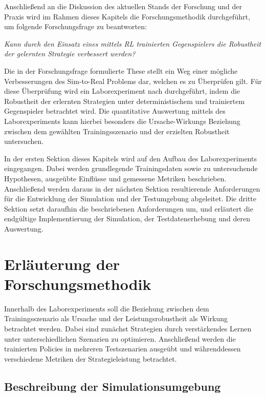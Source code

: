 Anschließend an die Diskussion des aktuellen Stands der Forschung und der Praxis wird im Rahmen dieses Kapitels die Forschungsmethodik durchgeführt, um folgende Forschungsfrage zu beantworten:

\textit{Kann durch den Einsatz eines mittels RL trainierten Gegenspielers die Robustheit der gelernten Strategie verbessert werden?}

Die in der Forschungsfrage formulierte These stellt ein Weg einer mögliche Verbesserungen des Sim-to-Real Problems dar, welchen es zu Überprüfen gilt.
Für diese Überprüfung wird ein Laborexperiment nach \cite[]{Recker.2021} durchgeführt, indem die Robustheit der erlernten Strategien unter deterministischem und trainiertem Gegenspieler betrachtet wird. 
Die quantitative Auswertung mittels des Laborexperiments kann hierbei besonders die Ursache-Wirkungs Beziehung zwischen dem gewählten Trainingsszenario und der erzielten Robustheit untersuchen.

In der ersten Sektion dieses Kapitels wird auf den Aufbau des Laborexperiments eingegangen.
Dabei werden grundlegende Trainingsdaten sowie zu untersuchende Hypothesen, ausgeübte Einflüsse und gemessene Metriken beschrieben.
Anschließend werden daraus in der nächsten Sektion resultierende Anforderungen für die Entwicklung der Simulation und der Testumgebung abgeleitet. 
Die dritte Sektion setzt daraufhin die beschriebenen Anforderungen um, und erläutert die endgültige Implementierung der Simulation, der Testdatenerhebung und deren Auswertung.

\section{Erläuterung der Forschungsmethodik}

Innerhalb des Laborexperiments soll die Beziehung zwischen dem Trainingsszenario als Ursache und der Leistungsrobustheit als Wirkung betrachtet werden.
Dabei sind zunächst Strategien durch verstärkendes Lernen unter unterschiedlichen Szenarien zu optimieren. 
Anschließend werden die trainierten Policies in mehreren Testszenarien ausgeübt und währenddessen verschiedene Metriken der Strategieleistung betrachtet.

\subsection{Beschreibung der Simulationsumgebung}

